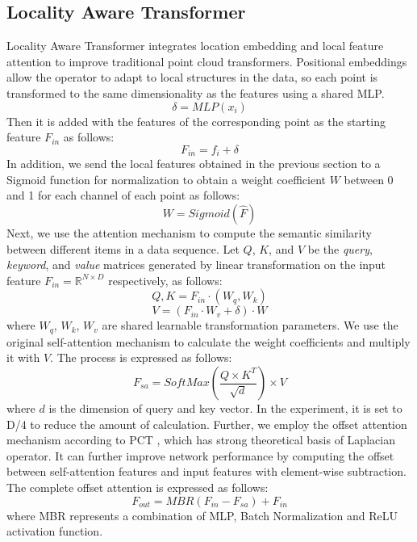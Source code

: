\documentclass[conference]{IEEEtran}
\begin{document}
\subsection{Locality Aware Transformer} Locality Aware Transformer integrates location embedding and local feature attention to improve traditional point cloud transformers. Positional embeddings allow the operator to adapt to local structures in the data, so each point is transformed to the same dimensionality as the features using a shared MLP. 
\begin{equation}
\delta = MLP(x_i)
\end{equation}
Then it is added with the features of the corresponding point as the starting feature $F_{in}$ as follows:
\begin{equation}
F_{in} = f_i + \delta
\end{equation}
In addition, we send the local features obtained in the previous section to a Sigmoid function for normalization to obtain a weight coefficient $W$ between 0 and 1 for each channel of each point as follows:
\begin{equation}
W=Sigmoid(\hat{F})
\end{equation}
Next, we use the attention mechanism to compute the semantic similarity between different items in a data sequence. Let $Q$, $K$, and $V$ be the \textit{query}, \textit{keyword}, and \textit{value} matrices generated by linear transformation on the input feature $F_{in} =\mathbb{R}^{N \times D} $  respectively, as follows:
\begin{equation}
Q,K=F_{in} \cdot (W_q,W_k)
\end{equation}
\begin{equation}
V= (F_{in} \cdot W_v + \delta) \cdot W
\end{equation}
where $W_q$, $W_k$, $W_v$ are shared learnable transformation parameters. We use the original self-attention mechanism to calculate the weight coefficients and multiply it with $V$. The process is expressed as follows:
\begin{equation}
F_{sa} = SoftMax(\frac{Q \times K^T}{\sqrt{d}}) \times V
\end{equation}
where $d$ is the dimension of query and key vector. In the experiment, it is set to D/4 to reduce the amount of calculation. Further, we employ the offset attention mechanism according to PCT \cite{guo2021pct}, which has strong theoretical basis of Laplacian operator. It can further improve network performance by computing the offset between self-attention features and input features with element-wise subtraction. The complete offset attention is expressed as follows:
\begin{equation}
F_{out} =MBR(F_{in} - F_{sa}) +F_{in}
\end{equation}
where MBR represents a combination of MLP, Batch Normalization and ReLU activation function.
\end{document}
